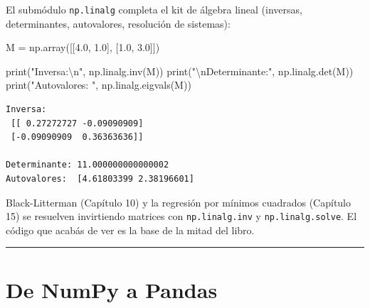 \documentclass[
  spanish,
  letterpaper,
  DIV=11,
  numbers=noendperiod]{scrreprt}
\newenvironment{Shaded}{\begin{snugshade}}{\end{snugshade}}
\newcommand{\BuiltInTok}[1]{\textcolor[rgb]{0.00,0.23,0.31}{#1}}
\newcommand{\CharTok}[1]{\textcolor[rgb]{0.13,0.47,0.30}{#1}}
\newcommand{\FloatTok}[1]{\textcolor[rgb]{0.68,0.00,0.00}{#1}}
\newcommand{\NormalTok}[1]{\textcolor[rgb]{0.00,0.23,0.31}{#1}}
\newcommand{\OperatorTok}[1]{\textcolor[rgb]{0.37,0.37,0.37}{#1}}
\newcommand{\StringTok}[1]{\textcolor[rgb]{0.13,0.47,0.30}{#1}}
\begin{document}
El submódulo \texttt{np.linalg} completa el kit de álgebra lineal
(inversas, determinantes, autovalores, resolución de sistemas):

\label{linalg}
\begin{Shaded}
\begin{Highlighting}[]
\NormalTok{M }\OperatorTok{=}\NormalTok{ np.array([[}\FloatTok{4.0}\NormalTok{, }\FloatTok{1.0}\NormalTok{],}
\NormalTok{              [}\FloatTok{1.0}\NormalTok{, }\FloatTok{3.0}\NormalTok{]])}

\BuiltInTok{print}\NormalTok{(}\StringTok{"Inversa:}\CharTok{\textbackslash{}n}\StringTok{"}\NormalTok{, np.linalg.inv(M))}
\BuiltInTok{print}\NormalTok{(}\StringTok{"}\CharTok{\textbackslash{}n}\StringTok{Determinante:"}\NormalTok{, np.linalg.det(M))}
\BuiltInTok{print}\NormalTok{(}\StringTok{"Autovalores: "}\NormalTok{, np.linalg.eigvals(M))}
\end{Highlighting}
\end{Shaded}

\begin{verbatim}
Inversa:
 [[ 0.27272727 -0.09090909]
 [-0.09090909  0.36363636]]

Determinante: 11.000000000000002
Autovalores:  [4.61803399 2.38196601]
\end{verbatim}

\begin{tcolorbox}[enhanced jigsaw, bottomrule=.15mm, colback=white, opacitybacktitle=0.6, arc=.35mm, toprule=.15mm, opacityback=0, breakable, titlerule=0mm, left=2mm, coltitle=black, colbacktitle=quarto-callout-note-color!10!white, colframe=quarto-callout-note-color-frame, leftrule=.75mm, toptitle=1mm, bottomtitle=1mm, title=\textcolor{quarto-callout-note-color}{\faInfo}\hspace{0.5em}{Guardá esto para más adelante}, rightrule=.15mm]

Black-Litterman (Capítulo 10) y la regresión por mínimos cuadrados
(Capítulo 15) se resuelven invirtiendo matrices con
\texttt{np.linalg.inv} y \texttt{np.linalg.solve}. El código que acabás
de ver es la base de la mitad del libro.

\end{tcolorbox}

\begin{center}\rule{0.5\linewidth}{0.5pt}\end{center}

\section{De NumPy a Pandas}\label{de-numpy-a-pandas}
\end{document}

